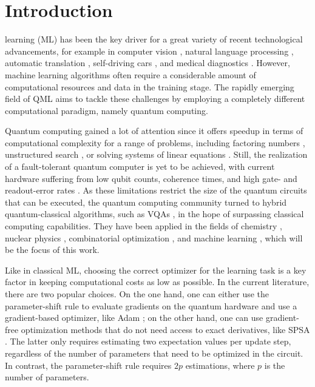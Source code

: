 \section{Introduction}
\label{sec:introduction}

 learning (ML) has been the key driver for a great variety of recent technological advancements, for example in computer vision \cite{Voulodimos2018}, natural language processing \cite{Otter2017}, automatic translation \cite{Vaswani2017}, self-driving cars \cite{Baheri2020}, and medical diagnostics \cite{fatima2017survey}. However, machine learning algorithms often require a considerable amount of computational resources and data in the training stage. The rapidly emerging field of \gls{QML} aims to tackle these challenges by employing a completely different computational paradigm, namely quantum computing. 

Quantum computing gained a lot of attention since it offers speedup in terms of computational complexity for a range of problems, including factoring numbers \cite{Shor94}, unstructured search \cite{Grover96}, or solving systems of linear equations \cite{Harrow09}. Still, the realization of a fault-tolerant quantum computer is yet to be achieved, with current hardware suffering from low qubit counts, coherence times, and high gate- and readout-error rates \cite{preskill2018quantum}. As these limitations restrict the size of the quantum circuits that can be executed, the quantum computing community turned to hybrid quantum-classical algorithms, such as \glspl{VQA} \cite{cerezo2021variational}, in the hope of surpassing classical computing capabilities. They have been applied in the fields of chemistry \cite{OMalley2016}, nuclear physics \cite{Kiss2022}, combinatorial optimization \cite{Farhi2014}, and machine learning \cite{farhi2018classification}, which will be the focus of this work.

Like in classical ML, choosing the correct optimizer for the learning task is a key factor in keeping computational costs as low as possible. In the current literature, there are two popular choices. On the one hand, one can either use the parameter-shift rule \cite{Schuld19} to evaluate gradients on the quantum hardware and use a gradient-based optimizer, like Adam \cite{ADAM}; on the other hand, one can use gradient-free optimization methods that do not need access to exact derivatives, like \gls{SPSA} \cite{Spall92}. The latter only requires estimating two expectation values per update step, regardless of the number of parameters that need to be optimized in the circuit. In contrast, the parameter-shift rule requires \(2p\) estimations, where \(p\) is the number of parameters.

